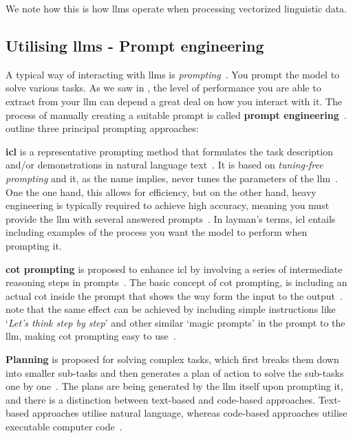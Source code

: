 
We note how this is how \acrshort{llms} operate when processing vectorized
linguistic data.


\subsection{Utilising \acrshort{llms} - Prompt engineering}\label{sec:llmUtilization}


A typical way of interacting with \acrshort{llms} is \textit{prompting}~\cite[44]{llmSurvey}. You
prompt the model to solve various tasks. As we saw in , the level of
performance you are able to extract from your \acrlong{llm} can depend a great deal on how you
interact with it. The process of manually creating a suitable prompt is called \textbf{prompt
    engineering}~\cite[44]{llmSurvey}.~\citeauthor{llmSurvey} outline three principal prompting
approaches:

\textbf{\acrfull{icl}} is a representative prompting method that formulates the task
description and/or demonstrations in natural language text~\cite[44]{llmSurvey}. It is based on
\textit{tuning-free prompting} and it, as the name implies, never tunes the parameters of the
\acrshort{llm}~\cite[15]{promptingSurvey}. One the one hand, this allows for efficiency, but on the
other hand, heavy engineering is typically required to achieve high accuracy, meaning you must
provide the \acrshort{llm} with several answered prompts~\cite[16]{promptingSurvey}. In layman's
terms, \acrshort{icl} entails including examples of the process you want the model to perform when
prompting it.

\textbf{\acrfull{cot} prompting} is proposed to enhance \acrlong{icl} by involving a
series of intermediate reasoning steps in prompts~\cite[44, 52]{llmSurvey}. The basic concept of
\acrshort{cot} prompting, is including an actual \acrlong{cot} inside the prompt that shows the way
form the input to the output~\cite[52]{llmSurvey}.~\citeauthor{llmSurvey} note that the same effect
can be achieved by including simple instructions like `\textit{Let's think step by step}' and other
similar `magic prompts' in the prompt to the \acrshort{llm}, making \acrshort{cot} prompting easy to
use~\cite[52]{llmSurvey}.

\textbf{Planning} is proposed for solving complex tasks, which first breaks them down into smaller
sub-tasks and then generates a plan of action to solve the sub-tasks one by
one~\cite[44, 54]{llmSurvey}. The plans are being generated by the \acrshort{llm} itself upon
prompting it, and there is a distinction between text-based and code-based approaches. Text-based
approaches utilise natural language, whereas code-based approaches utilise executable computer code~\cite[54-55]{llmSurvey}.


